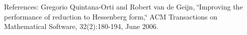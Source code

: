\begin{DoxyParagraph}{References\+: }
Gregorio Quintana-\/\+Orti and Robert van de Geijn, \char`\"{}\+Improving the
  performance of reduction to Hessenberg form,\char`\"{} A\+C\+M Transactions on Mathematical Software, 32(2)\+:180-\/194, June 2006. 
\end{DoxyParagraph}

